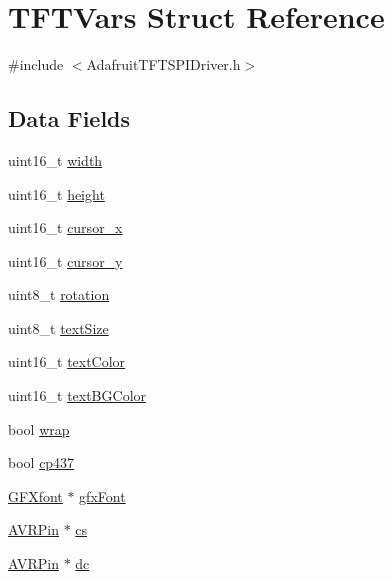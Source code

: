 \hypertarget{struct_t_f_t_vars}{}\section{T\+F\+T\+Vars Struct Reference}
\label{struct_t_f_t_vars}


{\ttfamily \#include $<$Adafruit\+T\+F\+T\+S\+P\+I\+Driver.\+h$>$}

\subsection*{Data Fields}
\begin{DoxyCompactItemize}
\item 
uint16\+\_\+t \mbox{\hyperlink{struct_t_f_t_vars_af74cf54cbe7c92de8ceab455e6148b46}{width}}
\item 
uint16\+\_\+t \mbox{\hyperlink{struct_t_f_t_vars_ab3f585ae776704ad0585c12491596ed4}{height}}
\item 
uint16\+\_\+t \mbox{\hyperlink{struct_t_f_t_vars_aed18f303a7d3af8dc2a72d160fe8dcc2}{cursor\+\_\+x}}
\item 
uint16\+\_\+t \mbox{\hyperlink{struct_t_f_t_vars_a41e7f18038ce1a39bb39bb8cc912dcfa}{cursor\+\_\+y}}
\item 
uint8\+\_\+t \mbox{\hyperlink{struct_t_f_t_vars_a610c6fea289d857fa54eab7f9d1ec45d}{rotation}}
\item 
uint8\+\_\+t \mbox{\hyperlink{struct_t_f_t_vars_a0aee7f2e640ddd75bd3e5ca8b8f72810}{text\+Size}}
\item 
uint16\+\_\+t \mbox{\hyperlink{struct_t_f_t_vars_ae21d648a4c3d9a48db289b1ec285ff90}{text\+Color}}
\item 
uint16\+\_\+t \mbox{\hyperlink{struct_t_f_t_vars_a7f56d2069ee784086ac9b1203c25b6e9}{text\+B\+G\+Color}}
\item 
bool \mbox{\hyperlink{struct_t_f_t_vars_a4ace5fa1c8cd6f56555a77bf8059bc0b}{wrap}}
\item 
bool \mbox{\hyperlink{struct_t_f_t_vars_aad6b036182e1ca11b1856ac18f916407}{cp437}}
\item 
\mbox{\hyperlink{struct_g_f_xfont}{G\+F\+Xfont}} $\ast$ \mbox{\hyperlink{struct_t_f_t_vars_a626dbe8464c13404897e1c74254104dd}{gfx\+Font}}
\item 
\mbox{\hyperlink{struct_a_v_r_pin}{A\+V\+R\+Pin}} $\ast$ \mbox{\hyperlink{struct_t_f_t_vars_a34d82933d6b232e82f57bcc42f045241}{cs}}
\item 
\mbox{\hyperlink{struct_a_v_r_pin}{A\+V\+R\+Pin}} $\ast$ \mbox{\hyperlink{struct_t_f_t_vars_a9e9fa6cfe200a6ded2303e583e0f3868}{dc}}

\end{DoxyCompactItemize}

